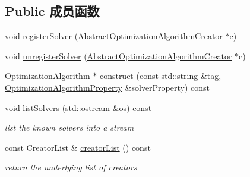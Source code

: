 \subsection*{Public 成员函数}
\begin{DoxyCompactItemize}
\item 
void \hyperlink{classg2o_1_1OptimizationAlgorithmFactory_a7726ae90dc3d5baf62fa364517e0fed7}{register\-Solver} (\hyperlink{classg2o_1_1AbstractOptimizationAlgorithmCreator}{Abstract\-Optimization\-Algorithm\-Creator} $\ast$c)
\item 
void \hyperlink{classg2o_1_1OptimizationAlgorithmFactory_adf79430f6176c9e9309a703ba2dbd14b}{unregister\-Solver} (\hyperlink{classg2o_1_1AbstractOptimizationAlgorithmCreator}{Abstract\-Optimization\-Algorithm\-Creator} $\ast$c)
\item 
\hyperlink{classg2o_1_1OptimizationAlgorithm}{Optimization\-Algorithm} $\ast$ \hyperlink{classg2o_1_1OptimizationAlgorithmFactory_aa386e02f78023241e557aa9135ba42d2}{construct} (const std\-::string \&tag, \hyperlink{structg2o_1_1OptimizationAlgorithmProperty}{Optimization\-Algorithm\-Property} \&solver\-Property) const 
\item 
\hypertarget{classg2o_1_1OptimizationAlgorithmFactory_a71e42179f0138bd00de1a4aa02c7f83a}{void \hyperlink{classg2o_1_1OptimizationAlgorithmFactory_a71e42179f0138bd00de1a4aa02c7f83a}{list\-Solvers} (std\-::ostream \&os) const }\label{classg2o_1_1OptimizationAlgorithmFactory_a71e42179f0138bd00de1a4aa02c7f83a}

\begin{DoxyCompactList}\small\item\em list the known solvers into a stream \end{DoxyCompactList}\item 
\hypertarget{classg2o_1_1OptimizationAlgorithmFactory_a0f86ea4b415f6ac6854324be09eea8fa}{const Creator\-List \& \hyperlink{classg2o_1_1OptimizationAlgorithmFactory_a0f86ea4b415f6ac6854324be09eea8fa}{creator\-List} () const }\label{classg2o_1_1OptimizationAlgorithmFactory_a0f86ea4b415f6ac6854324be09eea8fa}

\begin{DoxyCompactList}\small\item\em return the underlying list of creators \end{DoxyCompactList}\end{DoxyCompactItemize}
